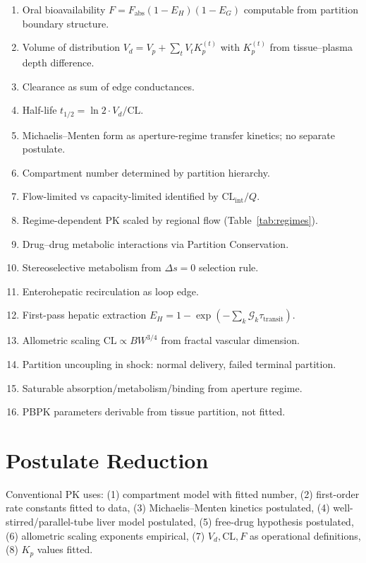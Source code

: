 \documentclass[twocolumn,10pt,a4paper]{article}
\theoremstyle{definition}
\theoremstyle{remark}
\newcommand{\Gcond}{\mathcal{G}}
\begin{document}
\begin{enumerate}[leftmargin=*,itemsep=1pt]
    \item Oral bioavailability $F = F_{\mathrm{abs}}(1-E_H)(1-E_G)$ computable from partition boundary structure.
    \item Volume of distribution $V_d = V_p + \sum_t V_tK_p^{(t)}$ with $K_p^{(t)}$ from tissue--plasma depth difference.
    \item Clearance as sum of edge conductances.
    \item Half-life $t_{1/2} = \ln 2\cdot V_d/\mathrm{CL}$.
    \item Michaelis--Menten form as aperture-regime transfer kinetics; no separate postulate.
    \item Compartment number determined by partition hierarchy.
    \item Flow-limited vs capacity-limited identified by $\mathrm{CL}_{\mathrm{int}}/Q$.
    \item Regime-dependent PK scaled by regional flow (Table~\ref{tab:regimes}).
    \item Drug--drug metabolic interactions via Partition Conservation.
    \item Stereoselective metabolism from $\Delta s = 0$ selection rule.
    \item Enterohepatic recirculation as loop edge.
    \item First-pass hepatic extraction $E_H = 1 - \exp(-\sum_k\Gcond_k\tau_{\mathrm{transit}})$.
    \item Allometric scaling $\mathrm{CL}\propto BW^{3/4}$ from fractal vascular dimension.
    \item Partition uncoupling in shock: normal delivery, failed terminal partition.
    \item Saturable absorption/metabolism/binding from aperture regime.
    \item PBPK parameters derivable from tissue partition, not fitted.
\end{enumerate}

\section{Postulate Reduction}

Conventional PK uses: (1) compartment model with fitted number, (2) first-order rate constants fitted to data, (3) Michaelis--Menten kinetics postulated, (4) well-stirred/parallel-tube liver model postulated, (5) free-drug hypothesis postulated, (6) allometric scaling exponents empirical, (7) $V_d, \mathrm{CL}, F$ as operational definitions, (8) $K_p$ values fitted.
\end{document}
